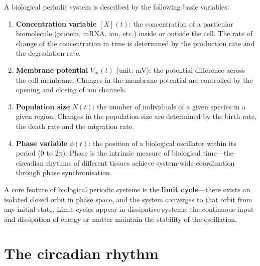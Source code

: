 \begin{definition}\label{def:biological_quantities}
A biological periodic system is described by the following basic variables:
\begin{enumerate}[label=(\roman*)]
    \item \textbf{Concentration variable} $[X](t)$: the concentration of a particular biomolecule (protein, mRNA, ion, etc.) inside or outside the cell. The rate of change of the concentration in time is determined by the production rate and the degradation rate.
    \item \textbf{Membrane potential} $V_m(t)$ (unit: mV): the potential difference across the cell membrane. Changes in the membrane potential are controlled by the opening and closing of ion channels.
    \item \textbf{Population size} $N(t)$: the number of individuals of a given species in a given region. Changes in the population size are determined by the birth rate, the death rate and the migration rate.
    \item \textbf{Phase variable} $\phi(t)$: the position of a biological oscillator within its period ($0$ to $2\pi$). Phase is the intrinsic measure of biological time---the circadian rhythms of different tissues achieve system-wide coordination through phase synchronisation.
\end{enumerate}
A core feature of biological periodic systems is the \textbf{limit cycle}---there exists an isolated closed orbit in phase space, and the system converges to that orbit from any initial state. Limit cycles appear in dissipative systems: the continuous input and dissipation of energy or matter maintain the stability of the oscillation.
\end{definition}

\section{The circadian rhythm}

